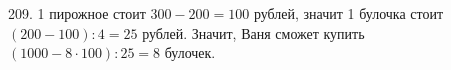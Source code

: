 209. 1 пирожное стоит $300-200=100$ рублей, значит 1 булочка стоит $(200-100):4=25$ рублей. Значит, Ваня сможет купить $(1000-8\cdot100):25=8$ булочек.\\
